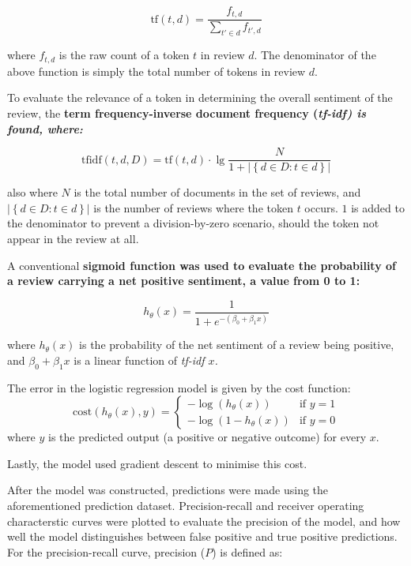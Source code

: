 \documentclass[12pt,bibliography=totocnumbered]{scrartcl}
\begin{document}
\begin{equation}
	\text{tf}(t,d) = \frac{f_{t,d}}{\sum_{t'\in d}^{}f_{t',d}}
	\label{eq:tf}
\end{equation}

where $f_{t,d}$ is the raw count of a token $t$ in review $d$. The denominator of the above
function is simply the total number of tokens in review $d$.

To evaluate the relevance of a token in determining the overall sentiment of the
review, the \bf{term frequency-inverse document frequency} (\it{tf-idf}) is found, where:

\begin{equation}
	\text{tfidf}(t,d,D) = \text{tf}(t,d)\cdot\lg\frac{N}{1+\left|\left\{d\in D : t\in d\right\}\right|}
	\label{eq:tfidf}
\end{equation}

also where $N$ is the total number of documents in the set of reviews, and
$\left|\left\{d\in D : t\in d\right\}\right|$ is the number of reviews where
the token $t$ occurs. $1$ is added to the denominator to prevent a
division-by-zero scenario, should the token not appear in the review at all.

A conventional \bf{sigmoid function} was used to evaluate the probability
of a review carrying a net positive sentiment, a value from 0 to 1:

\begin{equation}
	h_\theta(x) = \frac{1}{1+e^{-{\left(\beta_0+\beta_1x\right)}}}
	\label{eq:sigmoid}
\end{equation}

where $h_\theta(x)$ is the probability of the net sentiment of a review being positive, and
$\beta_0+\beta_1x$ is a linear function of \it{tf-idf} $x$.

The error in the logistic regression model is given by the cost function:
\begin{equation}
	\text{cost}\left(h_\theta\left(x\right),y\right) = \begin{cases}
		-\log\left(h_\theta\left(x\right)\right)   & \text{if } y = 1 \\
		-\log\left(1-h_\theta\left(x\right)\right) & \text{if } y = 0
	\end{cases}
\end{equation}
where $y$ is the predicted output (a positive or negative outcome) for every $x$.

Lastly, the model used gradient descent to minimise this cost.

After the model was constructed, predictions were made using the aforementioned
prediction dataset. Precision-recall and receiver operating characterstic curves
were plotted to evaluate the precision of the model,
and how well the model distinguishes between false positive and true positive predictions.
For the precision-recall curve, precision ($P$) is defined as:
\end{document}
